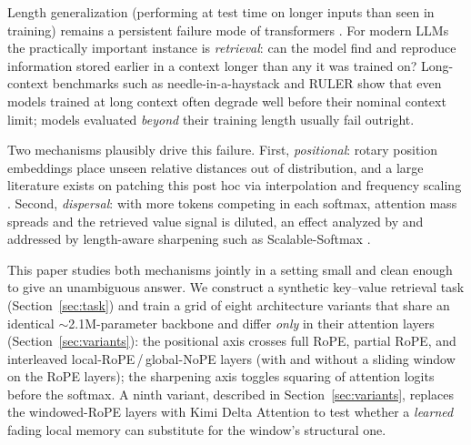 \documentclass[10pt]{article}
\begin{document}
Length generalization (performing at test time on longer inputs than seen in training) remains a persistent failure mode of transformers
\citep{anil2022exploring,zhou2024transformers}. For modern LLMs the
practically important instance is \emph{retrieval}: can the model find and
reproduce information stored earlier in a context longer than any it was
trained on? Long-context benchmarks such as needle-in-a-haystack
\citep{kamradt2023needle} and RULER \citep{hsieh2024ruler} show that even
models trained at long context often degrade well before their nominal
context limit; models evaluated \emph{beyond} their training length
usually fail outright.

Two mechanisms plausibly drive this failure. First, \emph{positional}:
rotary position embeddings \citep{su2021roformer} place unseen relative
distances out of distribution, and a large literature exists on
patching this post hoc via interpolation and frequency scaling
\citep{chen2023extending,peng2023yarn}. Second, \emph{dispersal}: with
more tokens competing in each softmax, attention mass spreads and the
retrieved value signal is diluted, an effect analyzed by
\citet{velickovic2024softmax} and addressed by length-aware sharpening
such as Scalable-Softmax \citep{nakanishi2025scalable}.

This paper studies both mechanisms jointly in a setting small and clean
enough to give an unambiguous answer. We construct a synthetic key--value
retrieval task (Section~\ref{sec:task}) and train a grid of eight
architecture variants that share an identical $\sim$2.1M-parameter
backbone and differ \emph{only} in their attention layers
(Section~\ref{sec:variants}): the positional axis crosses full RoPE,
partial RoPE, and interleaved local-RoPE\,/\,global-NoPE layers (with and
without a sliding window on the RoPE layers); the sharpening axis toggles
squaring of attention logits before the softmax. A ninth variant,
described in Section~\ref{sec:variants}, replaces the windowed-RoPE
layers with Kimi Delta Attention to test whether a \emph{learned} fading
local memory can substitute for the window's structural one.
\end{document}
